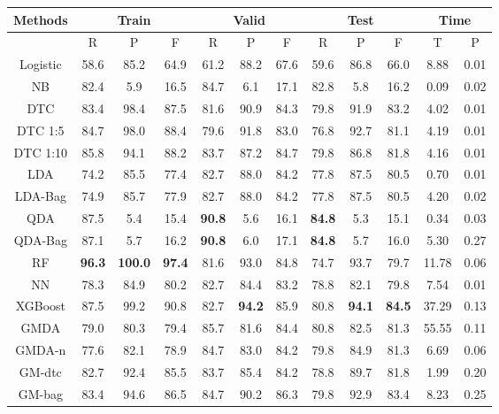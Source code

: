 \documentclass[english]{article}
\begin{document}
\begin{table}[htbp]
	\centering
	\setlength{\belowcaptionskip}{10pt}
	\begin{tabular}{|c|c|c|c|c|c|c|c|c|c|c|c|}
	\hline
	Methods & \multicolumn{3}{|c|}{Train} & \multicolumn{3}{|c|}{Valid} & \multicolumn{3}{|c|}{Test} & \multicolumn{2}{|c|}{Time}\\
	\hline
	& R & P & F & R & P & F & R & P & F & T & P\\
	\hline
Logistic & 58.6 & 85.2 & 64.9 & 61.2 & 88.2 & 67.6 & 59.6 & 86.8 & 66.0 & 8.88 & 0.01\\
\hline
NB & 82.4 & 5.9 & 16.5 & 84.7 & 6.1 & 17.1 & 82.8 & 5.8 & 16.2 & 0.09 & 0.02\\
\hline
DTC & 83.4 & 98.4 & 87.5 & 81.6 & 90.9 & 84.3 & 79.8 & 91.9 & 83.2 & 4.02 & 0.01\\
\hline
DTC 1:5 & 84.7 & 98.0 & 88.4 & 79.6 & 91.8 & 83.0 & 76.8 & 92.7 & 81.1 & 4.19 & 0.01\\
\hline
DTC 1:10 & 85.8 & 94.1 & 88.2 & 83.7 & 87.2 & 84.7 & 79.8 & 86.8 & 81.8 & 4.16 & 0.01\\
\hline
LDA & 74.2 & 85.5 & 77.4 & 82.7 & 88.0 & 84.2 & 77.8 & 87.5 & 80.5 & 0.70 & 0.01\\
\hline
LDA-Bag & 74.9 & 85.7 & 77.9 & 82.7 & 88.0 & 84.2 & 77.8 & 87.5 & 80.5 & 4.20 & 0.02\\
\hline
QDA & 87.5 & 5.4 & 15.4 & \textbf{90.8} & 5.6 & 16.1 & \textbf{84.8} & 5.3 & 15.1 & 0.34 & 0.03\\
\hline
QDA-Bag & 87.1 & 5.7 & 16.2 & \textbf{90.8} & 6.0 & 17.1 & \textbf{84.8} & 5.7 & 16.0 & 5.30 & 0.27\\
\hline
RF & \textbf{96.3} & \textbf{100.0} & \textbf{97.4} & 81.6 & 93.0 & 84.8 & 74.7 & 93.7 & 79.7 & 11.78 & 0.06\\
\hline
NN & 78.3 & 84.9 & 80.2 & 82.7 & 84.4 & 83.2 & 78.8 & 82.1 & 79.8 & 7.54 & 0.01\\
\hline
XGBoost & 87.5 & 99.2 & 90.8 & 82.7 & \textbf{94.2} & 85.9 & 80.8 & \textbf{94.1} & \textbf{84.5} & 37.29 & 0.13\\
\hline
GMDA & 79.0 & 80.3 & 79.4 & 85.7 & 81.6 & 84.4 & 80.8 & 82.5 & 81.3 & 55.55 & 0.11 \\
\hline
GMDA-n & 77.6 & 82.1 & 78.9 & 84.7 & 83.0 & 84.2 & 79.8 & 84.9 & 81.3 & 6.69 & 0.06 \\
\hline
GM-dtc & 82.7 & 92.4 & 85.5 & 83.7 & 85.4 & 84.2 & 78.8 & 89.7 & 81.8 & 1.99 & 0.20 \\
\hline
GM-bag & 83.4 & 94.6 & 86.5 & 84.7 & 90.2 & 86.3 & 79.8 & 92.9 & 83.4 & 8.23 & 0.25 \\

\end{tabular}
\end{table}
\end{document}
